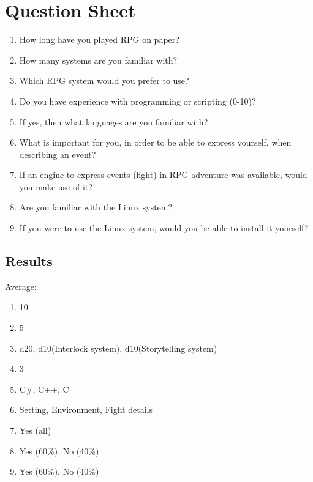 \chapter{Question Sheet}
\label{qsheets}
\begin{enumerate}
\item How long have you played RPG on paper?
\item How many systems are you familiar with?
\item Which RPG system would you prefer to use?
\item Do you have experience with programming or scripting (0-10)?
\item If yes, then what languages are you familiar with?
\item What is important for you, in order to be able to express yourself, when describing an event?
\item If an engine to express events (fight) in RPG adventure was available, would you make use of it?
\item Are you familiar with the Linux system?
\item If you were to use the Linux system, would you be able to install it yourself?
\end{enumerate}

\section*{Results}

Average:
\begin{enumerate}
\item 10
\item 5
\item d20, d10(Interlock system), d10(Storytelling system)
\item 3
\item C\#, C++, C
\item Setting, Environment, Fight details
\item Yes (all)
\item Yes (60\%), No (40\%)
\item Yes (60\%), No (40\%)
\end{enumerate}